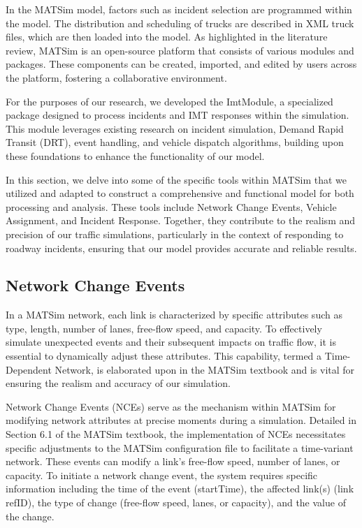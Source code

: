 \documentclass[fancy, oneside, mastersfancy, ms]{byuthesis}
\begin{document}
In the MATSim model, factors such as incident selection are programmed
within the model. The distribution and scheduling of trucks are
described in XML truck files, which are then loaded into the model. As
highlighted in the literature review, MATSim is an open-source platform
that consists of various modules and packages. These components can be
created, imported, and edited by users across the platform, fostering a
collaborative environment.

For the purposes of our research, we developed the ImtModule, a
specialized package designed to process incidents and IMT responses
within the simulation. This module leverages existing research on
incident simulation, Demand Rapid Transit (DRT), event handling, and
vehicle dispatch algorithms, building upon these foundations to enhance
the functionality of our model.

In this section, we delve into some of the specific tools within MATSim
that we utilized and adapted to construct a comprehensive and functional
model for both processing and analysis. These tools include Network
Change Events, Vehicle Assignment, and Incident Response. Together, they
contribute to the realism and precision of our traffic simulations,
particularly in the context of responding to roadway incidents, ensuring
that our model provides accurate and reliable results.

\hypertarget{network-change-events}{%
\subsection{Network Change Events}\label{network-change-events}}

In a MATSim network, each link is characterized by specific attributes
such as type, length, number of lanes, free-flow speed, and capacity. To
effectively simulate unexpected events and their subsequent impacts on
traffic flow, it is essential to dynamically adjust these attributes.
This capability, termed a Time-Dependent Network, is elaborated upon in
the MATSim textbook and is vital for ensuring the realism and accuracy
of our simulation.

Network Change Events (NCEs) serve as the mechanism within MATSim for
modifying network attributes at precise moments during a simulation.
Detailed in Section 6.1 of the MATSim textbook, the implementation of
NCEs necessitates specific adjustments to the MATSim configuration file
to facilitate a time-variant network. These events can modify a link's
free-flow speed, number of lanes, or capacity. To initiate a network
change event, the system requires specific information including the
time of the event (startTime), the affected link(s) (link refID), the
type of change (free-flow speed, lanes, or capacity), and the value of
the change.
\end{document}

